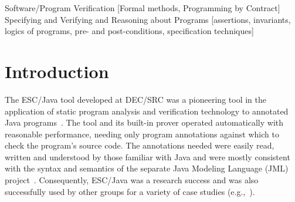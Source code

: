 \documentclass{acm_proc_article-sp}
\newif\ifpdf
\begin{document}
\newcommand{\myhref}[2]{\ifpdf\href{#1}{#2}\else\htmladdnormallinkfoot{#2}{#1}\fi}

\maketitle
\begin{abstract}
The ESC/Java tool was a useful advance in effective static checking of realistic Java programs,
but has become somewhat out of date with respect to Java and the Java Modeling Language (JML).
The ESC/Java2 project, whose progress is described in this paper, builds on ESC/Java to parse
all of JML, to increase the amount of static checking performed, and to enalrge the tool's
availability.  It is intended that ESC/Java2 be used for further research in annotation and verification, for larger-scale case studies of annotation and verification, and for studies in programmer productivity that may result from integration with other tools that work with JML.
\end{abstract}

                {Software/Program Verification}
                [Formal methods, Programming by Contract]
                {Specifying and Verifying and Reasoning about Programs}
                [assertions, invariants, logics of programs,
                pre- and post-conditions, specification techniques]




\section{Introduction}

The ESC/Java tool developed at DEC/SRC was a pioneering tool in the
application of static program analysis and verification technology to
annotated Java programs~\cite{ESCJava}.  The tool and its built-in
prover operated automatically with reasonable performance, needing
only program annotations against which to check the program's source
code.  The annotations needed were easily read, written and understood
by those familiar with Java and were mostly consistent with the syntax
and semantics of the separate Java Modeling Language (JML)
project~\cite{Leavens-etal00,jmlpapers}.  Consequently, ESC/Java was a
research success and was also successfully used by other groups for a
variety of case studies (e.g.,~\cite{Hub03,HOP04}).
\end{document}
